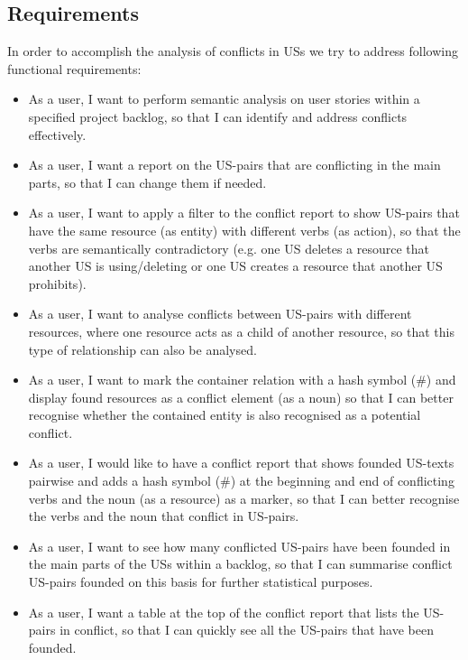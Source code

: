\subsection{Requirements}\label{conflict_requirement}
In order to accomplish the analysis of conflicts in USs we try to address following functional requirements:
\begin{itemize}
	
	\item As a user, I want to perform semantic analysis on user stories within a specified project backlog, so that I can identify and address conflicts effectively.
	
	\item As a user, I want a report on the US-pairs that are conflicting in the main parts, so that I can change them if needed.
	
	\item As a user, I want to apply a filter to the conflict report to  show US-pairs that have the same resource (as entity) with different verbs (as action), so that the verbs are semantically contradictory (e.g. one US deletes a resource that another US is using/deleting or one US creates a resource that another US prohibits).
	
	\item As a user, I want to analyse conflicts between US-pairs with different resources, where one resource acts as a child of another resource, so that this type of relationship can also be analysed.
	
	
	\item As a user, I want to mark the container relation with a hash symbol (\#) and display found resources as a conflict element (as a noun) so that I can better recognise whether the contained entity is also recognised as a potential conflict.
	
	\item As a user, I would like to have a conflict report that shows founded US-texts pairwise and adds a hash symbol (\#) at the beginning and end of conflicting verbs and the noun (as a resource) as a marker, so that I can better recognise the verbs and the noun that conflict in US-pairs.
	
	\item As a user, I want to see how many conflicted US-pairs have been founded in the main parts of the USs within a backlog, so that I can summarise conflict US-pairs founded on this basis for further statistical purposes.
	
	\item As a user, I want a table at the top of the conflict report that lists the US-pairs in conflict, so that I can quickly see all the US-pairs that have been founded.
	
\end{itemize}

